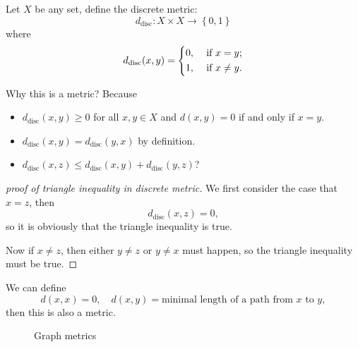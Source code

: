 \begin{definition} \label{def: Discrete metric}
    Let \(X\) be any set, define the discrete metric:
    \[
        d_{\text{disc}}: X \times X \to \left\{ 0,1 \right\} 
    \] where 
    \[
        d_{\text{disc}}(x, y) = \begin{dcases}
            0 , &\text{ if } x = y ;\\
            1, &\text{ if }  x \neq y.
        \end{dcases}
    \]
\end{definition}
Why this is a metric? Because
\begin{itemize}
    \item \(d_{\text{disc}}(x, y) \ge 0\) for all \(x, y \in X\) and \(d(x, y) = 0\) if and only if \(x = y\). 
    \item \(d_{\text{disc}}(x, y) = d_{\text{disc}}(y, x)\) by definition. 
    \item \(d_{\text{disc}}(x, z) \le d_{\text{disc}} (x, y) + d_{\text{disc}}(y, z)\)?      
\end{itemize}

\begin{proof}[proof of triangle inequality in discrete metric]
    We first consider the case that \(x=z\), then 
    \[
        d_{\text{disc}}(x,z)=0,
    \]
    so it is obviously that the triangle inequality is true. 
    
    Now if \(x \neq z\), then either \(y \neq z\) or \(y \neq x\) must happen, so the triangle inequality must be true.   
\end{proof}

\begin{eg}
    We can define 
    \[
        d(x, x) = 0, \quad d(x, y) = \text{minimal length of a path from }x \text{ to } y,
    \] then this is also a metric.
\end{eg}
\begin{figure}[H]
    \centering
    \caption{Graph metrics}
    \label{fig:GraphMetric}
\end{figure}

